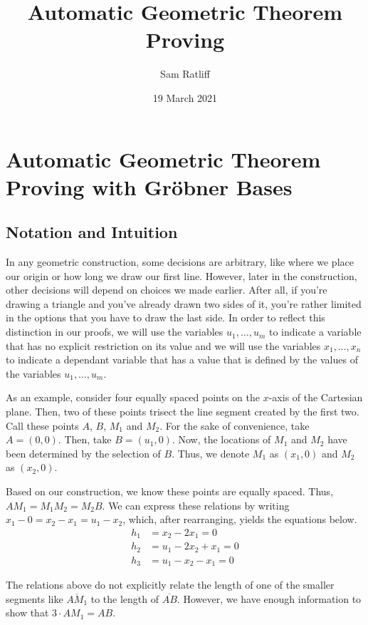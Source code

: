 \documentclass{article}
\title{Automatic Geometric Theorem Proving}
\author{Sam Ratliff}
\date{19 March 2021}
\theoremstyle{plain}
\theoremstyle{definition}
\theoremstyle{remark}
\begin{document}
\maketitle



\section{Automatic Geometric Theorem Proving with Gröbner Bases}

\subsection{Notation and Intuition}
In any geometric construction, some decisions are arbitrary, like where we place our origin or how long we draw our first line.
However, later in the construction, other decisions will depend on choices we made earlier. 
After all, if you're drawing a triangle and you've already drawn two sides of it, you're rather limited in the options that you have to draw the last side.
In order to reflect this distinction in our proofs,
we will use the variables $u_1,\dots,u_m$ to indicate a variable that has no explicit restriction on its value and 
we will use the variables $x_1,\dots,x_n$ to indicate a dependant variable that has a value that is defined by the values of the variables $u_1,\dots, u_m$. 

As an example, consider four equally spaced points on the $x$-axis of the Cartesian plane. Then, two of these points trisect the line segment created by the first two. 
Call these points $A$, $B$, $M_1$ and $M_2$. 
For the sake of convenience, take $A = (0,0)$.  Then, take $B = (u_1, 0)$. Now, the locations of $M_1$ and $M_2$ have been determined by the selection of $B$.
Thus, we denote $M_1$ as $(x_1,0)$ and $M_2$ as $(x_2,0)$.

Based on our construction, we know these points are equally spaced. Thus, $AM_1 = M_1M_2 = M_2B$.
We can express these relations by writing $x_1 - 0 = x_2  - x_1 = u_1 - x_2$, which, after rearranging, yields the equations below.
\begin{align*}
    h_1 & = x_2 - 2x_1 = 0\\
    h_2 & = u_1 - 2x_2 + x_1 = 0\\
    h_3 & = u_1 - x_2 - x_1 = 0
\end{align*}

The relations above do not explicitly relate the length of one of the smaller segments like $\overline{AM_1}$ to the length of $\overline{AB}$. 
However, we have enough information to show that $3\cdot AM_1 = AB$.
\end{document}
